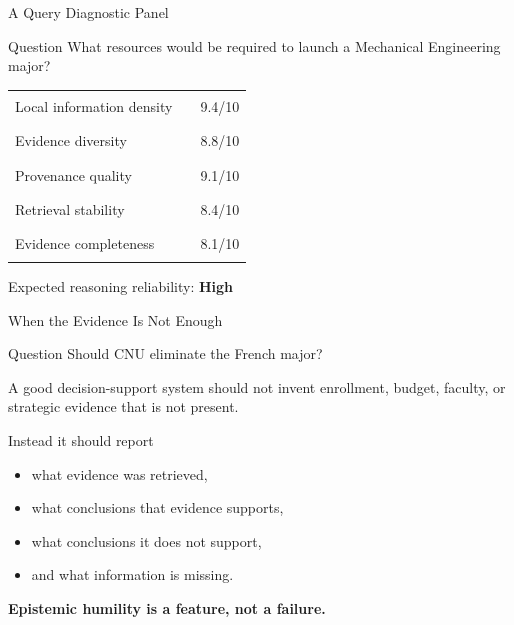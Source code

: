 \documentclass[aspectratio=169]{beamer}
\begin{document}
\begin{frame}{A Query Diagnostic Panel}

\small

\begin{block}{Question}
What resources would be required to launch a Mechanical Engineering major?
\end{block}

\vspace{0.35cm}

\begin{tabular}{p{}p{}r}
Local information density & \rule{3.6cm}{0.15cm} & 9.4/10 \\
Evidence diversity & \rule{3.2cm}{0.15cm} & 8.8/10 \\
Provenance quality & \rule{3.4cm}{0.15cm} & 9.1/10 \\
Retrieval stability & \rule{3.1cm}{0.15cm} & 8.4/10 \\
Evidence completeness & \rule{3.0cm}{0.15cm} & 8.1/10 \\
\end{tabular}

\vspace{0.5cm}

\begin{center}
\Large
Expected reasoning reliability: \textbf{High}
\end{center}

\end{frame}

\begin{frame}{When the Evidence Is Not Enough}

\small

\begin{block}{Question}
Should CNU eliminate the French major?
\end{block}

\vspace{0.3cm}

A good decision-support system should not invent enrollment, budget, faculty, or strategic evidence that is not present.

\vspace{0.4cm}

Instead it should report

\begin{itemize}
\item what evidence was retrieved,
\item what conclusions that evidence supports,
\item what conclusions it does not support,
\item and what information is missing.
\end{itemize}

\vspace{0.3cm}

\begin{center}
\Large
\textbf{Epistemic humility is a feature, not a failure.}
\end{center}

\end{frame}
\end{document}
